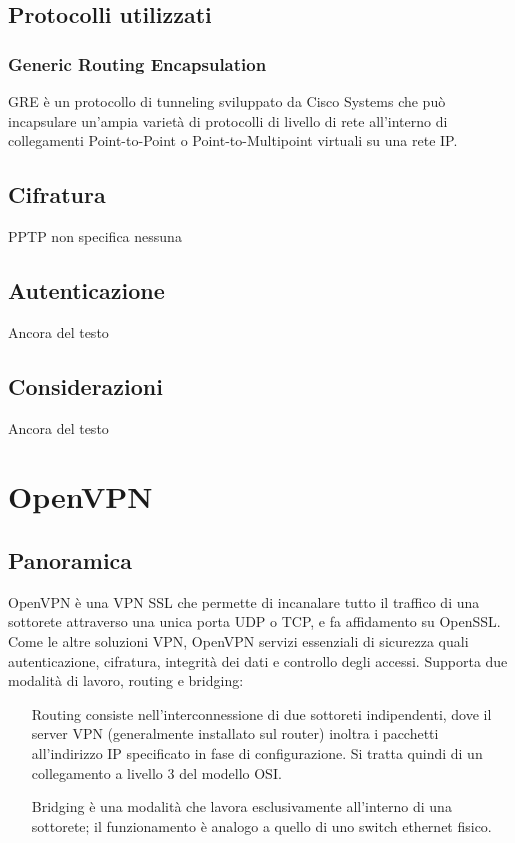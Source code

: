 \subsection{Protocolli utilizzati}
\subsubsection{Generic Routing Encapsulation}
GRE è un protocollo di tunneling sviluppato da Cisco Systems che può incapsulare un'ampia varietà di protocolli di livello di rete all'interno di collegamenti Point-to-Point o Point-to-Multipoint virtuali su una rete IP.

\subsection{Cifratura}
PPTP non specifica nessuna

\subsection{Autenticazione}
Ancora del testo

\subsection{Considerazioni}
Ancora del testo

\section{OpenVPN}
\subsection{Panoramica}
OpenVPN è una VPN SSL che permette di incanalare tutto il traffico di una sottorete attraverso una unica porta UDP o TCP, e fa affidamento su OpenSSL. Come le altre soluzioni VPN, OpenVPN servizi essenziali di sicurezza quali autenticazione, cifratura, integrità dei dati e controllo degli accessi.
Supporta due modalità di lavoro, routing e bridging:
\begin{itemize}
    \item[Routing] consiste nell'interconnessione di due sottoreti indipendenti, dove il server VPN (generalmente installato sul router) inoltra i pacchetti all'indirizzo IP specificato in fase di configurazione. Si tratta quindi di un collegamento a livello 3 del modello OSI.
    \item[Bridging] è una modalità che lavora esclusivamente all'interno di una sottorete; il funzionamento è analogo a quello di uno switch ethernet fisico.
\end{itemize}


